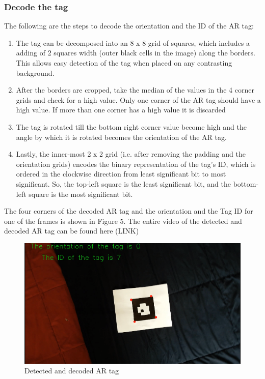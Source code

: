 \documentclass[conference]{IEEEtran}
\begin{document}
\subsubsection{Decode the tag}
The following are the steps to decode the orientation and the ID of the AR tag:
\begin{enumerate}
\item The tag can be decomposed into an 8 x 8 grid of squares, which includes a
adding of 2 squares width (outer black cells in the image) along the borders.
This allows easy detection of the tag when placed on any contrasting
background.
\item After the borders are cropped, take the median of the values in the 4 corner grids and check for a high value. Only one corner of the AR tag should have a high value. If more than one corner has a high value it is discarded
\item The tag is rotated till the bottom right corner value become high and the angle by which it is rotated becomes the orientation of the AR tag.
\item Lastly, the inner-most 2 x 2 grid (i.e. after removing the padding and the
orientation grids) encodes the binary representation of the tag’s ID,
which is ordered in the clockwise direction from least significant bit to
most significant. So, the top-left square is the least significant bit, and
the bottom-left square is the most significant bit.
\end{enumerate}
The four corners of the decoded AR tag and the orientation and the Tag ID for one of the frames is shown in Figure 5.
The entire video of the detected and decoded AR tag can be found here (LINK)
\begin{figure}[H]
\includegraphics[scale=0.4]{./Images/ar_tag_corner.png}
\centering
\caption{Detected and decoded AR tag}
\end{figure}
\end{document}

